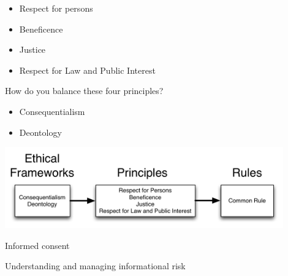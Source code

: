 \documentclass{beamer}
\def\vf{\vfill}
\begin{document}
\begin{frame}

\begin{itemize}
\item Respect for persons
\item Beneficence
\item Justice
\item Respect for Law and Public Interest
\end{itemize}

\vf
How do you balance these four principles?

\end{frame}
\begin{frame}

\begin{itemize}
\item Consequentialism
\item Deontology
\end{itemize}

\end{frame}
\begin{frame}

\begin{center}
\includegraphics[width=0.9\textwidth]{figures/ethics_schematic_simple.png}
\end{center}

\end{frame}
\begin{frame}

Informed consent

\end{frame}
\begin{frame}

Understanding and managing informational risk

\end{frame}
\end{document}
